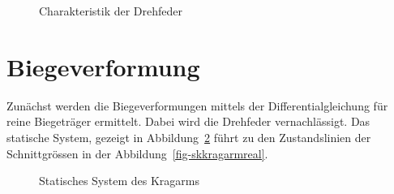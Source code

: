 \documentclass[
  11pt,
  letterpaper,
]{scrreprt}
\begin{document}
\begin{figure}[H]


\caption{\label{fig-springcharacteristic}Charakteristik der Drehfeder}

\end{figure}%

\section{Biegeverformung}\label{biegeverformung}

Zunächst werden die Biegeverformungen mittels der Differentialgleichung
für reine Biegeträger ermittelt. Dabei wird die Drehfeder
vernachlässigt. Das statische System, gezeigt in
Abbildung~\ref{fig-kragarm-sys} führt zu den Zustandslinien der
Schnittgrössen in der Abbildung~\ref{fig-skkragarmreal}.

\begin{figure}[H]


\caption{\label{fig-kragarm-sys}Statisches System des Kragarms}

\end{figure}%
\end{document}
